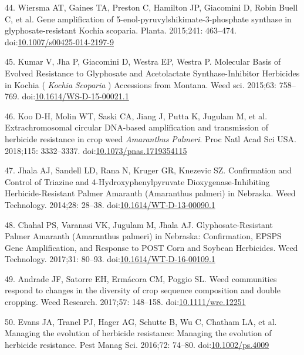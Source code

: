 \documentclass[10pt,letterpaper]{article}
\begin{document}
\leavevmode\hypertarget{ref-wiersma_gene_2015}{}%
44. Wiersma AT, Gaines TA, Preston C, Hamilton JP, Giacomini D, Robin
Buell C, et al. Gene amplification of
5-enol-pyruvylshikimate-3-phosphate synthase in glyphosate-resistant
Kochia scoparia. Planta. 2015;241: 463--474.
doi:\href{https://doi.org/10.1007/s00425-014-2197-9}{10.1007/s00425-014-2197-9}

\leavevmode\hypertarget{ref-kumar_molecular_2015}{}%
45. Kumar V, Jha P, Giacomini D, Westra EP, Westra P. Molecular Basis of
Evolved Resistance to Glyphosate and Acetolactate Synthase-Inhibitor
Herbicides in Kochia ( \emph{Kochia} \emph{Scoparia} ) Accessions from
Montana. Weed sci. 2015;63: 758--769.
doi:\href{https://doi.org/10.1614/WS-D-15-00021.1}{10.1614/WS-D-15-00021.1}

\leavevmode\hypertarget{ref-koo_extrachromosomal_2018}{}%
46. Koo D-H, Molin WT, Saski CA, Jiang J, Putta K, Jugulam M, et al.
Extrachromosomal circular DNA-based amplification and transmission of
herbicide resistance in crop weed \emph{Amaranthus} \emph{Palmeri}. Proc
Natl Acad Sci USA. 2018;115: 3332--3337.
doi:\href{https://doi.org/10.1073/pnas.1719354115}{10.1073/pnas.1719354115}

\leavevmode\hypertarget{ref-jhala_confirmation_2014}{}%
47. Jhala AJ, Sandell LD, Rana N, Kruger GR, Knezevic SZ. Confirmation
and Control of Triazine and 4-Hydroxyphenylpyruvate
Dioxygenase-Inhibiting Herbicide-Resistant Palmer Amaranth (Amaranthus
palmeri) in Nebraska. Weed Technology. 2014;28: 28--38.
doi:\href{https://doi.org/10.1614/WT-D-13-00090.1}{10.1614/WT-D-13-00090.1}

\leavevmode\hypertarget{ref-chahal_glyphosate-resistant_2017}{}%
48. Chahal PS, Varanasi VK, Jugulam M, Jhala AJ. Glyphosate-Resistant
Palmer Amaranth (Amaranthus palmeri) in Nebraska: Confirmation, EPSPS
Gene Amplification, and Response to POST Corn and Soybean Herbicides.
Weed Technology. 2017;31: 80--93.
doi:\href{https://doi.org/10.1614/WT-D-16-00109.1}{10.1614/WT-D-16-00109.1}

\leavevmode\hypertarget{ref-andrade_weed_2017}{}%
49. Andrade JF, Satorre EH, Ermácora CM, Poggio SL. Weed communities
respond to changes in the diversity of crop sequence composition and
double cropping. Weed Research. 2017;57: 148--158.
doi:\href{https://doi.org/10.1111/wre.12251}{10.1111/wre.12251}

\leavevmode\hypertarget{ref-evans_managing_2016}{}%
50. Evans JA, Tranel PJ, Hager AG, Schutte B, Wu C, Chatham LA, et al.
Managing the evolution of herbicide resistance: Managing the evolution
of herbicide resistance. Pest Manag Sci. 2016;72: 74--80.
doi:\href{https://doi.org/10.1002/ps.4009}{10.1002/ps.4009}
\end{document}
